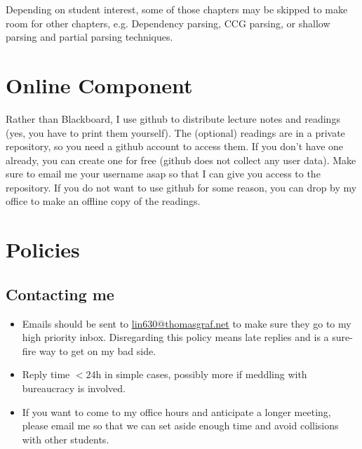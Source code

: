 Depending on student interest, some of those chapters may be skipped to make room for other chapters, e.g. Dependency parsing, CCG parsing, or shallow parsing and partial parsing techniques.

\section{Online Component}
Rather than Blackboard, I use github to distribute lecture notes and readings (yes, you have to print them yourself).
The (optional) readings are in a private repository, so you need a github account to access them.
If you don't have one already, you can create one for free (github does not collect any user data).
Make sure to email me your username asap so that I can give you access to the repository.
If you do not want to use github for some reason, you can drop by my office to make an offline copy of the readings.


\section{Policies}

\subsection{Contacting me}
\begin{itemize}
    \item Emails should be sent to \href{mailto://lin630@thomasgraf.net}{lin630@thomasgraf.net} to make sure they go to my high priority inbox.
        Disregarding this policy means late replies and is a sure-fire way to get on my bad side.
    \item Reply time $<24$h in simple cases, possibly more if meddling with bureaucracy is involved.
    \item If you want to come to my office hours and anticipate a longer meeting, please email me so that we can set aside enough time and avoid collisions with other students.
\end{itemize}


